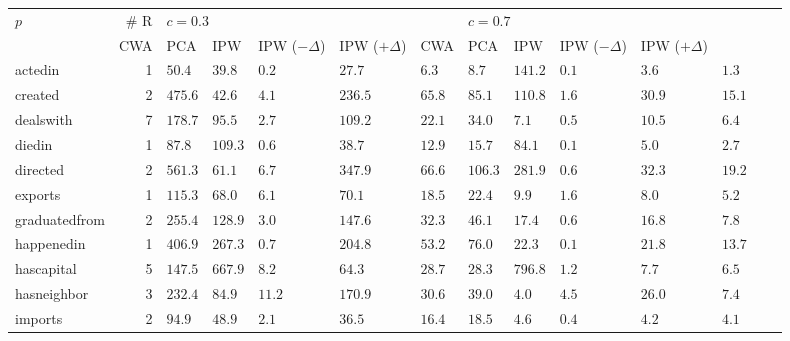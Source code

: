 \begin{tabular}{lr|llllll|llllll}
\toprule
           $p$ & \# R & \multicolumn{5}{l}{$c=0.3$} & \multicolumn{5}{l}{$c=0.7$} \\
               &      CWA &     PCA &         IPW & IPW ($-\Delta$) & IPW ($+\Delta$) &     CWA &        PCA &        IPW & IPW ($-\Delta$) & IPW ($+\Delta$) \\
\midrule
       actedin &    1 &   $50.4$ &  $39.8$ &  $\bm{0.2}$ &          $27.7$ &           $6.3$ &   $8.7$ &    $141.2$ & $\bm{0.1}$ &           $3.6$ &           $1.3$ \\
       created &    2 &  $475.6$ &  $42.6$ &  $\bm{4.1}$ &         $236.5$ &          $65.8$ &  $85.1$ &    $110.8$ & $\bm{1.6}$ &          $30.9$ &          $15.1$ \\
     dealswith &    7 &  $178.7$ &  $95.5$ &  $\bm{2.7}$ &         $109.2$ &          $22.1$ &  $34.0$ &      $7.1$ & $\bm{0.5}$ &          $10.5$ &           $6.4$ \\
        diedin &    1 &   $87.8$ & $109.3$ &  $\bm{0.6}$ &          $38.7$ &          $12.9$ &  $15.7$ &     $84.1$ & $\bm{0.1}$ &           $5.0$ &           $2.7$ \\
      directed &    2 &  $561.3$ &  $61.1$ &  $\bm{6.7}$ &         $347.9$ &          $66.6$ & $106.3$ &    $281.9$ & $\bm{0.6}$ &          $32.3$ &          $19.2$ \\
       exports &    1 &  $115.3$ &  $68.0$ &  $\bm{6.1}$ &          $70.1$ &          $18.5$ &  $22.4$ &      $9.9$ & $\bm{1.6}$ &           $8.0$ &           $5.2$ \\
 graduatedfrom &    2 &  $255.4$ & $128.9$ &  $\bm{3.0}$ &         $147.6$ &          $32.3$ &  $46.1$ &     $17.4$ & $\bm{0.6}$ &          $16.8$ &           $7.8$ \\
    happenedin &    1 &  $406.9$ & $267.3$ &  $\bm{0.7}$ &         $204.8$ &          $53.2$ &  $76.0$ &     $22.3$ & $\bm{0.1}$ &          $21.8$ &          $13.7$ \\
    hascapital &    5 &  $147.5$ & $667.9$ &  $\bm{8.2}$ &          $64.3$ &          $28.7$ &  $28.3$ &    $796.8$ & $\bm{1.2}$ &           $7.7$ &           $6.5$ \\
   hasneighbor &    3 &  $232.4$ &  $84.9$ & $\bm{11.2}$ &         $170.9$ &          $30.6$ &  $39.0$ & $\bm{4.0}$ &      $4.5$ &          $26.0$ &           $7.4$ \\
       imports &    2 &   $94.9$ &  $48.9$ &  $\bm{2.1}$ &          $36.5$ &          $16.4$ &  $18.5$ &      $4.6$ & $\bm{0.4}$ &           $4.2$ &           $4.1$ \\

\end{tabular}
